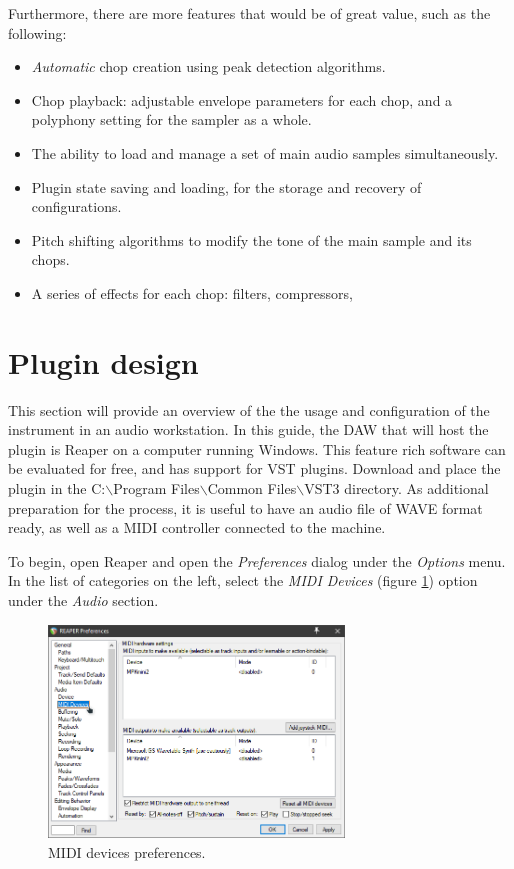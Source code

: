 \documentclass[12pt, a4paper, hidelinks]{article}
\begin{document}
	Furthermore, there are more features that would be of great value, such as the following:
	\begin{itemize}
		\item \textit{Automatic} chop creation using peak detection algorithms.
		\item Chop playback: adjustable envelope parameters for each chop, and a polyphony setting for the sampler as a whole.
		\item The ability to load and manage a set of main audio samples simultaneously.
		\item Plugin state saving and loading, for the storage and recovery of configurations.
		\item Pitch shifting algorithms to modify the tone of the main sample and its chops.
		\item A series of effects for each chop: filters, compressors, 
	\end{itemize}

		\newpage	
	\section{Plugin design}

	This section will provide an overview of the the usage and configuration of the instrument in an audio workstation. In this guide, the DAW that will host the plugin is Reaper \cite{reaper} on a computer running Windows. This feature rich software can be evaluated for free, and has support for VST plugins. Download \cite{plugin} and place the plugin in the C:$\backslash$Program Files$\backslash$Common Files$\backslash$VST3 directory.
	As additional preparation for the process, it is useful to have an audio file of WAVE format ready, as well as a MIDI controller connected to the machine.\par
	
	To begin, open Reaper and open the \textit{Preferences} dialog under the \textit{Options} menu. In the list of categories on the left, select the \textit{MIDI Devices} (figure \ref{fig:udevoff}) option under the \textit{Audio} section. 
	\begin{figure}[h]
		\centering
		\includegraphics[width=0.7\textwidth]{u/dev_off.png}
		\caption{MIDI devices preferences.}
		\label{fig:udevoff}
	\end{figure}
	
\end{document}
